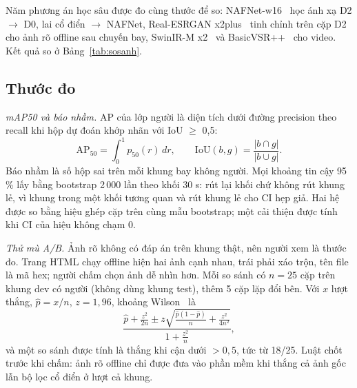 Năm phương án học sâu được đo cùng thước để so: NAFNet-w16~\cite{nafnet} học ánh xạ D2 $\to$ D0, lai cổ điển $\to$ NAFNet, Real-ESRGAN x2plus~\cite{realesrgan} tinh chỉnh trên cặp D2 cho ảnh rõ offline sau chuyến bay, SwinIR-M x2~\cite{swinir} và BasicVSR++~\cite{basicvsrpp} cho video. Kết quả so ở Bảng~\ref{tab:sosanh}.

\subsection{Thước đo}

\textit{mAP50 và báo nhầm.} AP của lớp người là diện tích dưới đường precision theo recall khi hộp dự đoán khớp nhãn với IoU $\geq$ 0,5:
\begin{equation}
\mathrm{AP}_{50}=\int_0^1 p_{50}(r)\,dr,\qquad \mathrm{IoU}(b,g)=\frac{|b\cap g|}{|b\cup g|}.
\label{eq:map}
\end{equation}
Báo nhầm là số hộp sai trên mỗi khung bay không người. Mọi khoảng tin cậy 95\,\% lấy bằng bootstrap 2\,000 lần theo khối 30 s: rút lại khối chứ không rút khung lẻ, vì khung trong một khối tương quan và rút khung lẻ cho CI hẹp giả. Hai hệ được so bằng hiệu ghép cặp trên cùng mẫu bootstrap; một cải thiện được tính khi CI của hiệu không chạm 0.

\textit{Thử mù A/B.} Ảnh rõ không có đáp án trên khung thật, nên người xem là thước đo. Trang HTML chạy offline hiện hai ảnh cạnh nhau, trái phải xáo trộn, tên file là mã hex; người chấm chọn ảnh dễ nhìn hơn. Mỗi so sánh có $n=25$ cặp trên khung dev có người (không dùng khung test), thêm 5 cặp lặp đổi bên. Với $x$ lượt thắng, $\hat p=x/n$, $z=1{,}96$, khoảng Wilson~\cite{wilson} là
\begin{equation}
\frac{\hat p+\frac{z^2}{2n}\pm z\sqrt{\frac{\hat p(1-\hat p)}{n}+\frac{z^2}{4n^2}}}{1+\frac{z^2}{n}},
\label{eq:wilson}
\end{equation}
và một so sánh được tính là thắng khi cận dưới $>0{,}5$, tức từ 18/25. Luật chốt trước khi chấm: ảnh rõ offline chỉ được đưa vào phần mềm khi thắng cả ảnh gốc lẫn bộ lọc cổ điển ở lượt cả khung.
